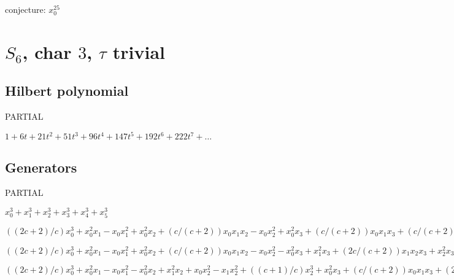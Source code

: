 \documentclass{article}
\numberwithin{equation}{section}
\begin{document}
conjecture: $x_0^{25}$


\section{$S_6$, char $3$, $\tau$ trivial}

\subsection{Hilbert polynomial}

PARTIAL

$1+6t+21t^2+51t^3+96t^4+147t^5+192t^6+222t^7+ \dots$




\subsection{Generators}

PARTIAL

$x_0^3 + x_1^3 + x_2^3 + x_3^3 + x_4^3 + x_5^3$


$((2c + 2)/c)x_0^3 + x_0^2x_1 - x_0x_1^2 + x_0^2x_2 + (c/(c +
2))x_0x_1x_2 - x_0x_2^2 + x_0^2x_3 + (c/(c + 2))x_0x_1x_3 +
(c/(c + 2))x_0x_2x_3 - x_0x_3^2 - x_0^2x_4 + x_1^2x_4 + (2c/(c +
2))x_1x_2x_4 + x_2^2x_4 + (2c/(c + 2))x_1x_3x_4 + (2c/(c +
2))x_2x_3x_4 + x_3^2x_4 + x_0x_4^2 - x_1x_4^2 - x_2x_4^2 -
x_3x_4^2 + ((c + 1)/c)x_4^3 + x_0^2x_5 + (c/(c + 2))x_0x_1x_5 +
(c/(c + 2))x_0x_2x_5 + (c/(c + 2))x_0x_3x_5 + (2c/(c +
2))x_1x_4x_5 + (2c/(c + 2))x_2x_4x_5 + (2c/(c + 2))x_3x_4x_5
- x_4^2x_5 - x_0x_5^2 + x_4x_5^2$


$((2c + 2)/c)x_0^3 + x_0^2x_1 - x_0x_1^2 + x_0^2x_2 + (c/(c +
2))x_0x_1x_2 - x_0x_2^2 - x_0^2x_3 + x_1^2x_3 + (2c/(c +
2))x_1x_2x_3 + x_2^2x_3 + x_0x_3^2 - x_1x_3^2 - x_2x_3^2 + ((c +
1)/c)x_3^3 + x_0^2x_4 + (c/(c + 2))x_0x_1x_4 + (c/(c +
2))x_0x_2x_4 + (2c/(c + 2))x_1x_3x_4 + (2c/(c + 2))x_2x_3x_4
- x_3^2x_4 - x_0x_4^2 + x_3x_4^2 + x_0^2x_5 + (c/(c +
2))x_0x_1x_5 + (c/(c + 2))x_0x_2x_5 + (2c/(c + 2))x_1x_3x_5 +
(2c/(c + 2))x_2x_3x_5 - x_3^2x_5 + (c/(c + 2))x_0x_4x_5 +
(2c/(c + 2))x_3x_4x_5 - x_0x_5^2 + x_3x_5^2$


$((2c + 2)/c)x_0^3 + x_0^2x_1 - x_0x_1^2 - x_0^2x_2 + x_1^2x_2 +
x_0x_2^2 - x_1x_2^2 + ((c + 1)/c)x_2^3 + x_0^2x_3 + (c/(c +
2))x_0x_1x_3 + (2c/(c + 2))x_1x_2x_3 - x_2^2x_3 - x_0x_3^2 +
x_2x_3^2 + x_0^2x_4 + (c/(c + 2))x_0x_1x_4 + (2c/(c +
2))x_1x_2x_4 - x_2^2x_4 + (c/(c + 2))x_0x_3x_4 + (2c/(c +
2))x_2x_3x_4 - x_0x_4^2 + x_2x_4^2 + x_0^2x_5 + (c/(c +
2))x_0x_1x_5 + (2c/(c + 2))x_1x_2x_5 - x_2^2x_5 + (c/(c +
2))x_0x_3x_5 + (2c/(c + 2))x_2x_3x_5 + (c/(c + 2))x_0x_4x_5 +
(2c/(c + 2))x_2x_4x_5 - x_0x_5^2 + x_2x_5^2$
\end{document}
